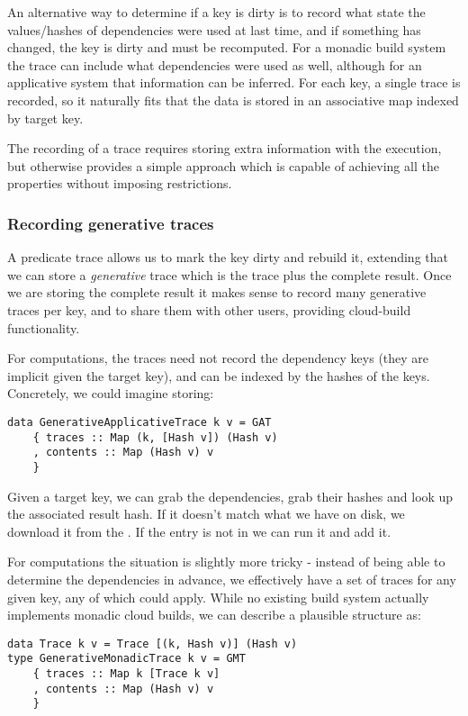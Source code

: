 An alternative way to determine if a key is dirty is to record what state the values/hashes of dependencies were used at last time, and if something has changed, the key is dirty and must be recomputed. For a monadic build system the trace can include what dependencies were used as well, although for an applicative system that information can be inferred. For each key, a single trace is recorded, so it naturally fits that the data is stored in an associative map indexed by target key.

The recording of a trace requires storing extra information with the execution, but otherwise provides a simple approach which is capable of achieving all the properties without imposing restrictions.

\subsubsection{Recording generative traces}

A predicate trace allows us to mark the key dirty and rebuild it, extending that we can store a \textit{generative} trace which is the trace plus the complete result. Once we are storing the complete result it makes sense to record many generative traces per key, and to share them with other users, providing cloud-build functionality.

For  computations, the traces need not record the dependency keys (they are implicit given the target key), and can be indexed by the hashes of the keys. Concretely, we could imagine storing:

\begin{verbatim}
data GenerativeApplicativeTrace k v = GAT
    { traces :: Map (k, [Hash v]) (Hash v)
    , contents :: Map (Hash v) v
    }
\end{verbatim}

Given a target key, we can grab the dependencies, grab their hashes and look up the associated result hash. If it doesn't match what we have on disk, we download it from the . If the entry is not in  we can run it and add it.

For  computations the situation is slightly more tricky - instead of being able to determine the dependencies in advance, we effectively have a set of traces for any given key, any of which could apply. While no existing build system actually implements monadic cloud builds, we can describe a plausible structure as:

\begin{verbatim}
data Trace k v = Trace [(k, Hash v)] (Hash v)
type GenerativeMonadicTrace k v = GMT
    { traces :: Map k [Trace k v]
    , contents :: Map (Hash v) v
    }
\end{verbatim}

